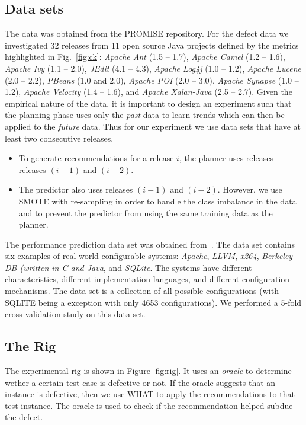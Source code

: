 \documentclass[conference]{IEEEtran}
\newcommand{\kw}[1]{\textit{#1}}
\begin{document}
\subsection{Data sets}
The data was obtained from the PROMISE repository. For the defect data we investigated 32 releases from 11 open source Java projects defined by the metrics highlighted in Fig.~\ref{fig:ck}: \kw{Apache Ant} (1.5 -- 1.7), \kw{Apache Camel} (1.2 -- 1.6), \kw{Apache Ivy} (1.1 -- 2.0), \kw{JEdit} (4.1 -- 4.3), \kw{Apache Log4j} (1.0 -- 1.2), \kw{Apache Lucene} (2.0 -- 2.2), \kw{PBeans} (1.0 and 2.0), \kw{Apache POI} (2.0 -- 3.0), \kw{Apache Synapse} (1.0 -- 1.2), \kw{Apache Velocity} (1.4 -- 1.6), and \kw{Apache Xalan-Java} (2.5 -- 2.7). Given the empirical nature of the data, it is important to design an experiment such that the planning phase uses only the \kw{past} data to learn trends which can then be applied to the \kw{future} data. Thus for our experiment we use data sets that have at least two consecutive releases. 
\begin{itemize}
\item To generate recommendations for a release $i$, the planner uses releases releases $(i-1)$ and $(i-2)$.
\item The predictor also uses releases $(i-1)$ and $(i-2)$. However, we use SMOTE with re-sampling in order to handle the class imbalance in the data and to prevent the predictor from using the same training data as the planner.
\end{itemize}


The performance prediction data set was obtained from~\cite{}. The data set contains six examples of real world configurable systems: \kw{Apache}, \kw{LLVM}, \kw{x264}, \kw{Berkeley DB (written in C and Java}, and \kw{SQLite}. The systems have different characteristics, different implementation languages, and different configuration mechanisms. The data set is a collection of all possible configurations (with SQLITE being a exception with only 4653 configurations). We performed a 5-fold cross validation study on this data set.

\subsection{The Rig}

The experimental rig is shown in Figure \ref{fig:rig}. It uses an \textit{oracle} to determine wether a certain test case is defective or not. If the oracle suggests that an instance is defective, then we use WHAT to apply the recommendations to that test instance. The oracle is used to check if the recommendation helped subdue the defect.
\end{document}
